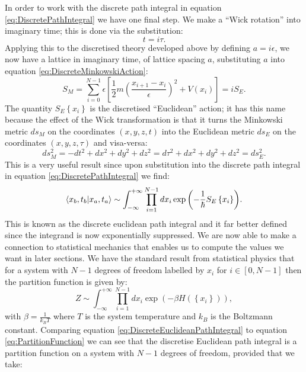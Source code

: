 \documentclass[12pt]{article}
\begin{document}
In order to work with the discrete path integral in equation \ref{eq:DiscretePathIntegral} we have one final step. We make a ``Wick rotation'' into imaginary time; this is done via the substitution:
\begin{equation}
	\label{eq:WickRotation}
	t = i\tau.
\end{equation}
Applying this to the discretised theory developed above by defining $a=i\epsilon$, we now have a lattice in imaginary time, of lattice spacing $a$, substituting $a$ into equation \ref{eq:DiscreteMinkowskiAction}:
\begin{equation}
	\label{eq:DiscreteEuclideanAction}
	S_M = \sum_{i=0}^{N-1} \epsilon \left[\frac{1}{2}m\left(\frac{x_{i+1}-x_{i}}{\epsilon}\right)^2 + V(x_i)\right] = iS_E.
\end{equation}
The quantity $S_{E}\left\{x_i\right\}$ is the discretised ``Euclidean'' action; it has this name because the effect of the Wick transformation is that it turns the Minkowski metric $ds_{M}$ on the coordinates $\left(x,y,z,t\right)$ into the Euclidean metric $ds_{E}$ on the coordinates $\left(x,y,z,\tau\right)$ and visa-versa:
\begin{equation}
	\label{eq:MetricTransform}
	 ds_{M}^{2}= -dt^2 + dx^2 + dy^2 + dz^2 = d\tau^2 + dx^2 + dy^2 + dz^2 = ds_{E}^{2}.
\end{equation}
This is a very useful result since upon substitution into the discrete path integral in equation \ref{eq:DiscretePathIntegral} we find:
\begin{equation}
	\label{eq:DiscreteEuclideanPathIntegral}
	\braket{x_b,t_b|x_a,t_a} \sim \int^{+\infty}_{-\infty}\prod_{i=1}^{N-1}dx_i \exp{\left(-\frac{1}{\hbar}S_{E}\left\{x_i\right\}\right)}.
\end{equation}
This is known as the discrete euclidean path integral and it far better defined since the integrand is now exponentially suppressed. We are now able to make a connection to statistical mechanics that enables us to compute the values we want in later sections. We have the standard result from statistical physics that for a system with $N-1$ degrees of freedom labelled by $x_i$ for $i \in \left[0,N-1\right]$ then the partition function is given by:
\begin{equation}
	\label{eq:PartitionFunction}
	Z \sim \int_{-\infty}^{+\infty}\prod_{i=1}^{N-1}dx_{i}\exp{\left(-\beta H\left(\left\{x_i\right\}\right)\right)},
\end{equation}
with $\beta=\frac{1}{k_{B}T}$ where $T$ is the system temperature and $k_{B}$ is the Boltzmann constant. Comparing equation \ref{eq:DiscreteEuclideanPathIntegral} to equation \ref{eq:PartitionFunction} we can see that the discretise Euclidean path integral is a partition function on a system with $N-1$ degrees of freedom, provided that we take:
\end{document}
